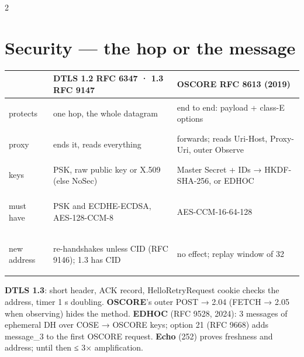 \documentclass[8pt]{extarticle}
\begin{document}
\begin{multicols}{2}
\section{Security — the hop or the message}
{\scriptsize\setlength{\tabcolsep}{2pt}
\begin{tabular}{@{}>{\bfseries\raggedright\arraybackslash}p{10mm}>{\raggedright\arraybackslash}p{32mm}>{\raggedright\arraybackslash}p{34mm}@{}}
\toprule
 & \textbf{DTLS} 1.2 RFC 6347 · 1.3 RFC 9147 & \textbf{OSCORE} RFC 8613 (2019)\\
\midrule
protects & one hop, the whole datagram & end to end: payload + class-E options\\
proxy & ends it, reads everything & forwards; reads Uri-Host, Proxy-Uri, outer Observe\\
keys & PSK, raw public key or X.509 (else NoSec) & Master Secret + IDs → HKDF-SHA-256, or EDHOC\\
must have & PSK and ECDHE-ECDSA, AES-128-CCM-8 & AES-CCM-16-64-128\\
new address & 1.2 re-handshakes unless CID (RFC 9146); 1.3 has CID & no effect; replay window of 32\\
\bottomrule
\end{tabular}}\par
\textbf{DTLS 1.3}: short header, ACK record, HelloRetryRequest cookie checks the address, timer 1 s
doubling. \textbf{OSCORE}'s outer POST → 2.04 (FETCH → 2.05 when observing) hides the method.
\textbf{EDHOC} (RFC 9528, 2024): 3 messages of ephemeral DH over COSE → OSCORE keys; option 21
(RFC 9668) adds message\_3 to the first OSCORE request. \textbf{Echo} (252) proves freshness and
address; until then ≤ 3× amplification.


\end{multicols}
\end{document}

